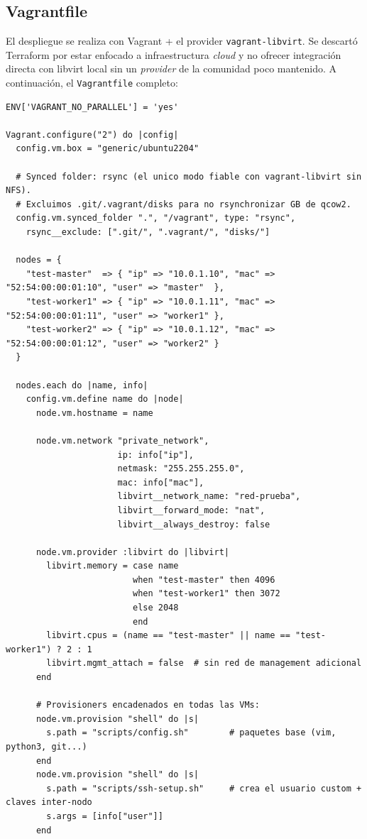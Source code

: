 \subsection{Vagrantfile}

El despliegue se realiza con Vagrant + el provider \texttt{vagrant-libvirt}. Se descartó Terraform por estar enfocado a infraestructura \emph{cloud} y no ofrecer integración directa con libvirt local sin un \emph{provider} de la comunidad poco mantenido. A continuación, el \texttt{Vagrantfile} completo:

\begin{lstlisting}[style=bash]
ENV['VAGRANT_NO_PARALLEL'] = 'yes'

Vagrant.configure("2") do |config|
  config.vm.box = "generic/ubuntu2204"

  # Synced folder: rsync (el unico modo fiable con vagrant-libvirt sin NFS).
  # Excluimos .git/.vagrant/disks para no rsynchronizar GB de qcow2.
  config.vm.synced_folder ".", "/vagrant", type: "rsync",
    rsync__exclude: [".git/", ".vagrant/", "disks/"]

  nodes = {
    "test-master"  => { "ip" => "10.0.1.10", "mac" => "52:54:00:00:01:10", "user" => "master"  },
    "test-worker1" => { "ip" => "10.0.1.11", "mac" => "52:54:00:00:01:11", "user" => "worker1" },
    "test-worker2" => { "ip" => "10.0.1.12", "mac" => "52:54:00:00:01:12", "user" => "worker2" }
  }

  nodes.each do |name, info|
    config.vm.define name do |node|
      node.vm.hostname = name

      node.vm.network "private_network",
                      ip: info["ip"],
                      netmask: "255.255.255.0",
                      mac: info["mac"],
                      libvirt__network_name: "red-prueba",
                      libvirt__forward_mode: "nat",
                      libvirt__always_destroy: false

      node.vm.provider :libvirt do |libvirt|
        libvirt.memory = case name
                         when "test-master" then 4096
                         when "test-worker1" then 3072
                         else 2048
                         end
        libvirt.cpus = (name == "test-master" || name == "test-worker1") ? 2 : 1
        libvirt.mgmt_attach = false  # sin red de management adicional
      end

      # Provisioners encadenados en todas las VMs:
      node.vm.provision "shell" do |s|
        s.path = "scripts/config.sh"        # paquetes base (vim, python3, git...)
      end
      node.vm.provision "shell" do |s|
        s.path = "scripts/ssh-setup.sh"     # crea el usuario custom + claves inter-nodo
        s.args = [info["user"]]
      end


\end{lstlisting}
